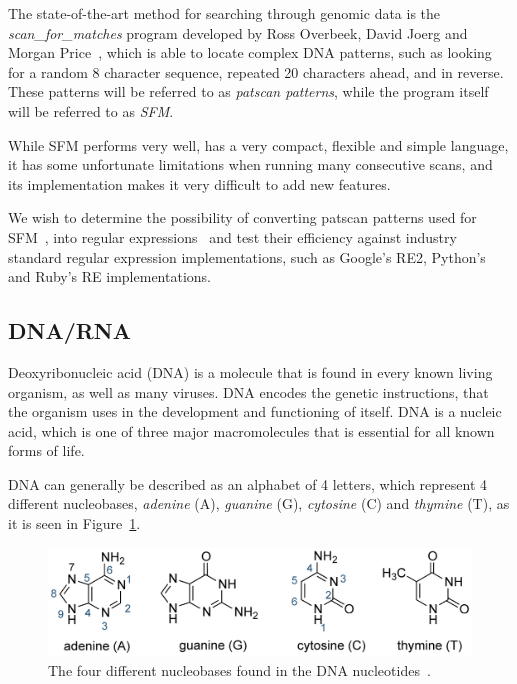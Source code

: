 \documentclass[12pt]{article}
\theoremstyle{definition}
\begin{document}
The state-of-the-art method for searching through genomic data is the \mbox{\emph{scan\_for\_matches}} program developed by Ross Overbeek, David Joerg and Morgan Price~\cite{scan_for_matches}, which is able to locate complex DNA patterns, such as looking for a random 8 character sequence, repeated 20 characters ahead, and in reverse. These patterns will be referred to as \textit{patscan patterns}, while the program itself will be referred to as \textit{SFM}.

While SFM performs very well, has a very compact, flexible and simple language, it has some unfortunate limitations when running many consecutive scans, and its implementation makes it very difficult to add new features.

We wish to determine the possibility of converting patscan patterns used for SFM~\cite{scan_for_matches}, into regular expressions~\cite{crash-course-regex} and test their efficiency against industry standard regular expression implementations, such as Google's RE2, Python's and Ruby's RE implementations.

\subsection{DNA/RNA}

Deoxyribonucleic acid (DNA) is a molecule that is found in every known living organism, as well as many viruses. DNA encodes the genetic instructions, that the organism uses in the development and functioning of itself. DNA is a nucleic acid, which is one of three major macromolecules that is essential for all known forms of life.

DNA can generally be described as an alphabet of 4 letters, which represent 4 different nucleobases, \emph{adenine} (A), \emph{guanine} (G), \emph{cytosine} (C) and \emph{thymine} (T), as it is seen in Figure~\ref{dnabases}.

\begin{figure}[H]
\begin{center}
	\includegraphics[scale=1.3]{DNA-heterocyclic-bases-large.png}
\end{center}
\caption{The four different nucleobases found in the DNA nucleotides~\cite{DNA-biotechacademy}.}
\label{dnabases}
\end{figure}
\end{document}
